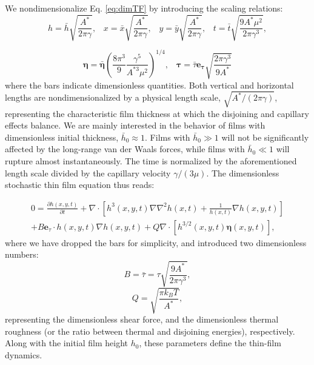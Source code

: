 \documentclass[
 onecolumn,
 amsmath,amssymb,
floatfix,superscriptaddress
]{revtex4-2}
\begin{document}
We nondimensionalize Eq. \eqref{eq:dimTF} by introducing the scaling relations:
\[h=\bar{h}\sqrt{\frac{A^*}{2\pi \gamma}}, \hspace{10pt} x=\bar{x}\sqrt{\frac{A^*}{2\pi \gamma}},
\hspace{10pt} y=\bar{y}\sqrt{\frac{A^*}{2\pi \gamma}},
\hspace{10pt}
t=\bar{t}\sqrt{\frac{9A^*\mu^2}{2\pi \gamma^3}},\]

\[\boldsymbol{\eta}=\bar{\boldsymbol{\eta}}\left(\frac{8\pi^3}{9}\frac{\gamma^5}{A^{*3}\mu^2}\right)^{1/4}
, \hspace{10pt} \boldsymbol{\tau}=\bar{\tau}\boldsymbol{{e_{\tau}}}\sqrt{\frac{2\pi \gamma^3}{9A^*}}\]
where the bars indicate dimensionless quantities. Both vertical and horizontal lengths are nondimensionalized by a physical length scale, $\sqrt{A^*/(2\pi \gamma)}$, representing the characteristic film thickness at which the disjoining and capillary effects balance. We are mainly interested in the behavior of films with dimensionless initial thickness, $\bar{h}_0 \approx 1$. Films with $\bar{h}_0 \gg 1$ will not be significantly affected by the long-range van der Waals forces, while films with $\bar{h}_0 \ll 1$ will rupture almost instantaneously. The time is normalized by the aforementioned length scale divided by the capillary velocity $\gamma/(3\mu)$. The dimensionless stochastic thin film equation thus reads:

\begin{eqnarray} \label{eq:TFQB}
    0=\frac{\partial h(x,y,t)}{\partial t} +  \nabla\cdot\left[h^3(x,y,t)\nabla\nabla ^2h(x,t) + \frac{1}{h(x,t)}\nabla h(x,y,t)\right] \nonumber \\+B\boldsymbol{e}_\tau\cdot h(x,y,t)\nabla h(x,y,t) + Q  \nabla\cdot\left[h^{3/2}(x,y,t)\boldsymbol{\eta}(x,y,t)\right],
\end{eqnarray}
 where we have dropped the bars for simplicity, and introduced two dimensionless numbers: 
\begin{equation}
B=\bar{\tau}=\tau \sqrt{\frac{9A^*}{2 \pi \gamma ^3}},
\end{equation}
\begin{equation}
Q=\sqrt{\frac{\pi k_B T}{A^*}},
\end{equation}
representing the dimensionless shear force, and the dimensionless thermal roughness (or the ratio between thermal and disjoining energies), respectively. Along with the initial film height $h_0$, these parameters  define the thin-film dynamics.
\end{document}
